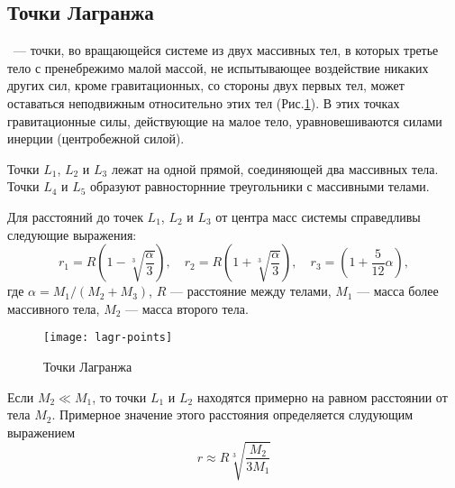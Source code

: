 \subsection{Точки Лагранжа}

~--- точки, во вращающейся системе из двух
массивных тел, в которых третье тело с пренебрежимо 
малой массой, не испытывающее воздействие никаких 
других сил, кроме гравитационных, со стороны двух 
первых тел, может оставаться неподвижным относительно 
этих тел (Рис.\ref{pic:lagr-points}). В этих точках гравитационные силы, 
действующие на малое тело, уравновешиваются силами инерции (центробежной силой).

Точки $L_1$, $L_2$ и $L_3$ лежат на одной прямой, 
соединяющей два массивных тела. Точки $L_4$ и $L_5$ 
образуют равносторнние треугольники с массивными 
телами.

Для расстояний до точек $L_1$, $L_2$ и $L_3$ от 
центра масс системы справедливы следующие выражения:
\begin{equation}r_1=R\left(1-\sqrt[3]{\frac{\alpha}
{3}}\right), \quad r_2=R\left(1+\sqrt[3]{\frac{\alpha}
{3}}\right), \quad r_3=\left(1+\frac{5}{12}\alpha\right),
\end{equation}
где $\alpha=M_1/(M_2+M_3)$, $R$ --- расстояние между 
телами, $M_1$ --- масса более массивного тела, $M_2$
 --- масса второго тела.
\begin{figure}[h!]
\centering
\texttt{[image: lagr-points]}
\caption{Точки Лагранжа}\label{pic:lagr-points}
\end{figure}

Если $M_2\ll M_1$, то точки $L_1$ и $L_2$ находятся 
примерно на равном расстоянии от тела $M_2$. 
Примерное значение этого расстояния определяется слудующим 
выражением\begin{equation}
r\approx R\sqrt[3]{\frac{M_2}{3M_1}}
\end{equation}
